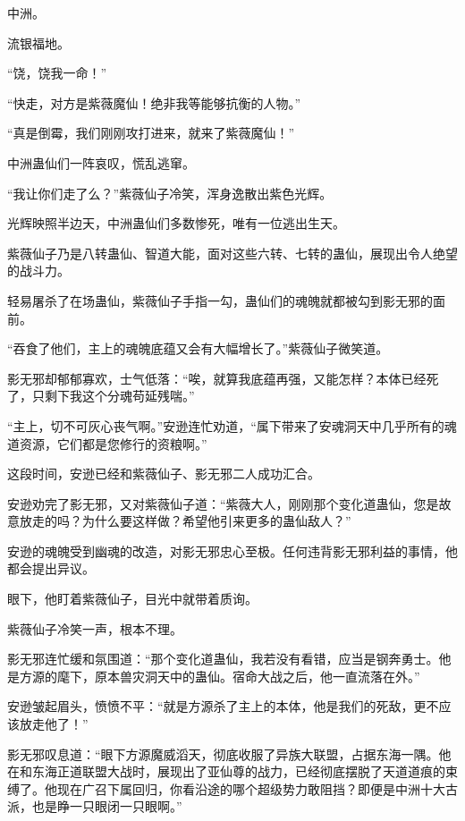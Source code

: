 
\begin{this_body}

中洲。

流银福地。

“饶，饶我一命！”

“快走，对方是紫薇魔仙！绝非我等能够抗衡的人物。”

“真是倒霉，我们刚刚攻打进来，就来了紫薇魔仙！”

中洲蛊仙们一阵哀叹，慌乱逃窜。

“我让你们走了么？”紫薇仙子冷笑，浑身逸散出紫色光辉。

光辉映照半边天，中洲蛊仙们多数惨死，唯有一位逃出生天。

紫薇仙子乃是八转蛊仙、智道大能，面对这些六转、七转的蛊仙，展现出令人绝望的战斗力。

轻易屠杀了在场蛊仙，紫薇仙子手指一勾，蛊仙们的魂魄就都被勾到影无邪的面前。

“吞食了他们，主上的魂魄底蕴又会有大幅增长了。”紫薇仙子微笑道。

影无邪却郁郁寡欢，士气低落：“唉，就算我底蕴再强，又能怎样？本体已经死了，只剩下我这个分魂苟延残喘。”

“主上，切不可灰心丧气啊。”安逊连忙劝道，“属下带来了安魂洞天中几乎所有的魂道资源，它们都是您修行的资粮啊。”

这段时间，安逊已经和紫薇仙子、影无邪二人成功汇合。

安逊劝完了影无邪，又对紫薇仙子道：“紫薇大人，刚刚那个变化道蛊仙，您是故意放走的吗？为什么要这样做？希望他引来更多的蛊仙敌人？”

安逊的魂魄受到幽魂的改造，对影无邪忠心至极。任何违背影无邪利益的事情，他都会提出异议。

眼下，他盯着紫薇仙子，目光中就带着质询。

紫薇仙子冷笑一声，根本不理。

影无邪连忙缓和氛围道：“那个变化道蛊仙，我若没有看错，应当是钢奔勇士。他是方源的麾下，原本兽灾洞天中的蛊仙。宿命大战之后，他一直流落在外。”

安逊皱起眉头，愤愤不平：“就是方源杀了主上的本体，他是我们的死敌，更不应该放走他了！”

影无邪叹息道：“眼下方源魔威滔天，彻底收服了异族大联盟，占据东海一隅。他在和东海正道联盟大战时，展现出了亚仙尊的战力，已经彻底摆脱了天道道痕的束缚了。他现在广召下属回归，你看沿途的哪个超级势力敢阻挡？即便是中洲十大古派，也是睁一只眼闭一只眼啊。”


\end{this_body}
